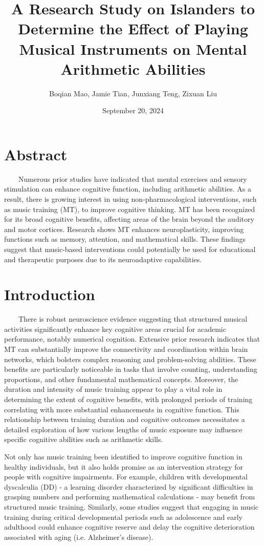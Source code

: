 \documentclass[11pt]{article}
\title{A Research Study on Islanders to Determine the Effect of Playing Musical Instruments on Mental Arithmetic Abilities}
\date{September 20, 2024}
\author{Boqian Mao, Jamie Tian, Junxiang Teng, Zixuan Liu}
\begin{document}
\begin{titlingpage}
\maketitle
\end{titlingpage}

{\newpage}
\tableofcontents

{\newpage}
\section{Abstract}
~~~~Numerous prior studies have indicated that mental exercises and sensory stimulation can enhance cognitive function, including arithmetic abilities. As a result, there is growing interest in using non-pharmacological interventions, such as music training (MT), to improve cognitive thinking. MT has been recognized for its broad cognitive benefits, affecting areas of the brain beyond the auditory and motor cortices. Research shows MT enhances neuroplasticity, improving functions such as memory, attention, and mathematical skills. These findings suggest that music-based interventions could potentially be used for educational and therapeutic purposes due to its neuroadaptive capabilities.

\section{Introduction}
~~~~There is robust neuroscience evidence suggesting that structured musical activities significantly enhance key cognitive areas crucial for academic performance, notably numerical cognition. Extensive prior research indicates that MT can substantially improve the connectivity and coordination within brain networks, which bolsters complex reasoning and problem-solving abilities. These benefits are particularly noticeable in tasks that involve counting, understanding proportions, and other fundamental mathematical concepts. Moreover, the duration and intensity of music training appear to play a vital role in determining the extent of cognitive benefits, with prolonged periods of training correlating with more substantial enhancements in cognitive function. This relationship between training duration and cognitive outcomes necessitates a detailed exploration of how various lengths of music exposure may influence specific cognitive abilities such as arithmetic skills.

Not only has music training been identified to improve cognitive function in healthy individuals, but it also holds promise as an intervention strategy for people with cognitive impairments. For example, children with developmental dyscalculia (DD) - a learning disorder characterized by significant difficulties in grasping numbers and performing mathematical calculations - may benefit from structured music training. Similarly, some studies suggest that engaging in music training during critical developmental periods such as adolescence and early adulthood could enhance cognitive reserve and delay the cognitive deterioration associated with aging (i.e. Alzheimer’s disease).
\end{document}
